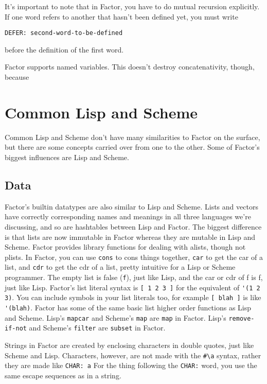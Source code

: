 \documentclass{article}
\begin{document}
It's important to note that in Factor, you have to do mutual recursion explicitly. If one word refers to another that hasn't been defined yet, you must write
\begin{verbatim}
DEFER: second-word-to-be-defined
\end{verbatim}
before the definition of the first word.

Factor supports named variables. This doesn't destroy concatenativity, though, because 

\section{Common Lisp and Scheme}

Common Lisp and Scheme don't have many similarities to Factor on the surface, but there are some concepts carried over from one to the other. Some of Factor's biggest influences are Lisp and Scheme.

\subsection{Data}

Factor's builtin datatypes are also similar to Lisp and Scheme. Lists and vectors have correctly corresponding names and meanings in all three languages we're discussing, and so are hashtables between Lisp and Factor. The biggest difference is that lists are now immutable in Factor whereas they are mutable in Lisp and Scheme. Factor provides library functions for dealing with alists, though not plists. In Factor, you can use \texttt{cons} to cons things together, \texttt{car} to get the car of a list, and \texttt{cdr} to get the cdr of a list, pretty intuitive for a Lisp or Scheme programmer. The empty list is false (\texttt{f}), just like Lisp, and the car or cdr of f is f, just like Lisp. Factor's list literal syntax is \verb|[ 1 2 3 ]| for the equivalent of \verb|'(1 2 3)|. You can include symbols in your list literals too, for example \verb|[ blah ]| is like \verb|'(blah)|. Factor has some of the same basic list higher order functions as Lisp and Scheme. Lisp's \texttt{mapcar} and Scheme's \texttt{map} are \texttt{map} in Factor. Lisp's \texttt{remove-if-not} and Scheme's \texttt{filter} are \texttt{subset} in Factor.


Strings in Factor are created by enclosing characters in double quotes, just like Scheme and Lisp. Characters, however, are not made with the \verb|#\a| syntax, rather they are made like \verb|CHAR: a| For the thing following the \texttt{CHAR:} word, you use the same escape sequences as in a string.
\end{document}
